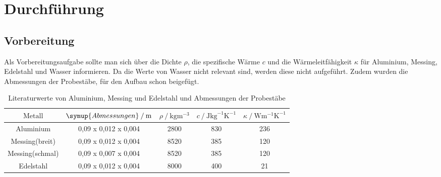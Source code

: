 \section{Durchführung}
\label{sec:Durchführung}
\subsection{Vorbereitung}
Als Vorbereitungsaufgabe sollte man sich über die Dichte $\rho$, die spezifische Wärme $c$ und die Wärmeleitfähigkeit $\kappa$ für 
Aluminium, Messing, Edelstahl und Wasser informieren. Da die Werte von Wasser nicht relevant sind, werden diese nicht aufgeführt. Zudem wurden 
die Abmessungen der Probestäbe, für den Aufbau schon beigefügt.
\begin{table}
    \centering
    \caption{Literaturwerte von Aluminium, Messing und Edelstahl und Abmessungen der Probestäbe}
    \label{tab:litwerte}
    \begin{tabular}{c c c c c}
        \toprule
        $\text{Metall}$ & $\symup{Abmessungen} \mathbin{/} \si{\meter}$ &$\rho \mathbin{/} \si{\kilogram\meter\tothe{-3}}$ 
        & $c \mathbin{/} \si{\joule\kilogram\tothe{-1}\kelvin\tothe{-1}}$ & $\kappa \mathbin{/} \si{\watt\meter\tothe{-1}\kelvin\tothe{-1}}$\\
        \midrule
        Aluminium & 0,09 x 0,012 x 0,004 & 2800 & 830 & 236 \\
        Messing(breit)   &  0,09 x 0,012 x 0,004 &8520 & 385 & 120 \\
        Messing(schmal)   & 0,09 x 0,007 x 0,004 &8520 & 385 & 120 \\
        Edelstahl &0,09 x 0,012 x 0,004  &8000 & 400 & 21  \\
        \bottomrule
    \end{tabular}
\end{table}
